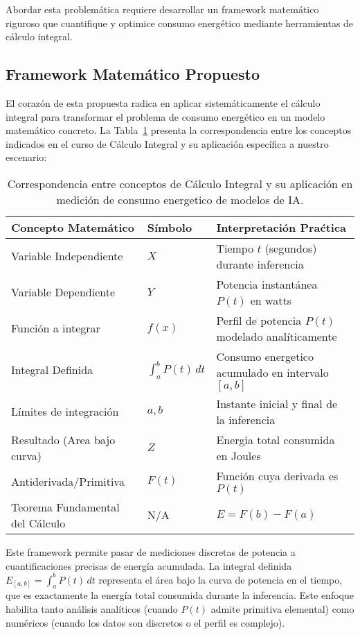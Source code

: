 Abordar esta problemática requiere desarrollar un framework matemático riguroso que cuantifique y optimice consumo energético mediante herramientas de cálculo integral.

\subsection{Framework Matemático Propuesto}

El corazón de esta propuesta radica en aplicar sistemáticamente el cálculo integral para transformar el problema de consumo energético en un modelo matemático concreto. La Tabla~\ref{tab:framework} presenta la correspondencia entre los conceptos indicados en el curso de Cálculo Integral y su aplicación específica a nuestro escenario:

\begin{table}[H]
    \centering
    \caption{Correspondencia entre conceptos de C\'{a}lculo Integral y su aplicaci\'{o}n en medici\'{o}n de consumo energetico de modelos de IA.}
    \label{tab:framework}
    \begin{tabular}{p{4.5cm}p{2.5cm}p{7cm}}
    \toprule
    \textbf{Concepto Matem\'{a}tico} & \textbf{S\'{i}mbolo} & \textbf{Interpretaci\'{o}n Pra\'{c}tica} \\
    \midrule
    Variable Independiente & $X$ & Tiempo $t$ (segundos) durante inferencia \\
    Variable Dependiente & $Y$ & Potencia instant\'{a}nea $P(t)$ en watts \\
    Funci\'{o}n a integrar & $f(x)$ & Perfil de potencia $P(t)$ modelado anal\'{i}ticamente \\
    Integral Definida & $\displaystyle \int_a^b P(t)\,dt$ & Consumo energetico acumulado en intervalo $[a,b]$ \\
    L\'{i}mites de integraci\'{o}n & $a, b$ & Instante inicial y final de la inferencia \\
    Resultado (Area bajo curva) & $Z$ & Energia total consumida en Joules \\
    Antiderivada/Primitiva & $F(t)$ & Funci\'{o}n cuya derivada es $P(t)$ \\
    Teorema Fundamental del C\'{a}lculo & N/A & $E = F(b) - F(a)$ \\
    \bottomrule
    \end{tabular}
\end{table}

Este framework permite pasar de mediciones discretas de potencia a cuantificaciones precisas de energía acumulada. La integral definida $E_{[a,b]} = \int_a^b P(t)\,dt$ representa el área bajo la curva de potencia en el tiempo, que es exactamente la energía total consumida durante la inferencia. Este enfoque habilita tanto análisis analíticos (cuando $P(t)$ admite primitiva elemental) como numéricos (cuando los datos son discretos o el perfil es complejo).

